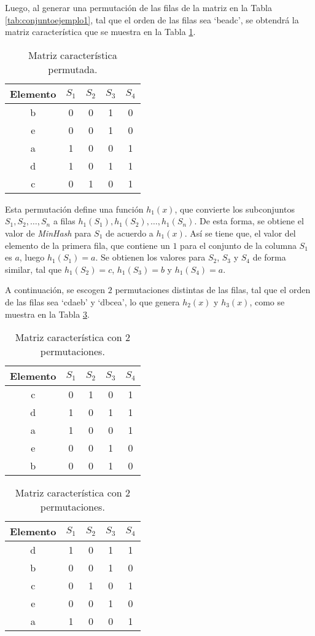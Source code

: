 Luego, al generar una permutación de las filas de la matriz en la Tabla \ref{tab:conjuntoejemplo1},
tal que el orden de las filas sea ‘beadc’, se obtendrá la matriz característica
que se muestra en la Tabla \ref{tab:conjuntoejemplo2}.

\begin{table}[h]
\caption{Matriz característica permutada.}
\label{tab:conjuntoejemplo2}
\small
\centering
\begin{tabular}{ccccc}
\hline
{Elemento} & {$S_1$} & {$S_2$} & {$S_3$} & {$S_4$} \\
\hline
b & 0 & 0 & 1 & 0 \\
e & 0 & 0 & 1 & 0 \\
a & 1 & 0 & 0 & 1 \\
d & 1 & 0 & 1 & 1 \\
c & 0 & 1 & 0 & 1 \\
\hline
\end{tabular}
\end{table}

Esta permutación define una función  $h_1(x)$,
que convierte los subconjuntos $S_1, S_2, \ldots, S_n$ a filas 
$h_1(S_1), h_1(S_2), \ldots, h_1(S_n)$.
De esta forma, se obtiene el valor de \textit{MinHash} para $S_1$ de acuerdo a $h_1(x)$.
Así se tiene que, el valor del elemento de la primera fila,
que contiene un $1$ para el conjunto de la columna $S_1$ es $a$,
luego $h_1(S_1) = a$. Se obtienen los valores para $S_2$, $S_3$ y $S_4$ de forma similar,
tal que $h_1(S_2) = c$, $h_1(S_3) = b$ y $h_1(S_4) = a$.

A continuación, se escogen $2$ permutaciones distintas de las filas,
tal que el orden de las filas sea ‘cdaeb’ y ‘dbcea’, lo que genera $h_2(x)$ y $h_3(x)$,
como se muestra en la Tabla \ref{tab:conjuntoejemplo3}.

\begin{table}[h]
\caption{Matriz característica con 2 permutaciones.}
\label{tab:conjuntoejemplo3}
\small
\centering
\begin{tabular}{ccccc}
\hline
{Elemento} & {$S_1$} & {$S_2$} & {$S_3$} & {$S_4$} \\
\hline
c & 0 & 1 & 0 & 1 \\
d & 1 & 0 & 1 & 1 \\
a & 1 & 0 & 0 & 1 \\
e & 0 & 0 & 1 & 0 \\
b & 0 & 0 & 1 & 0 \\
\hline
\end{tabular}
\quad
\begin{tabular}{ccccc}
\hline
{Elemento} & {$S_1$} & {$S_2$} & {$S_3$} & {$S_4$} \\
\hline
d & 1 & 0 & 1 & 1 \\
b & 0 & 0 & 1 & 0 \\
c & 0 & 1 & 0 & 1 \\
e & 0 & 0 & 1 & 0 \\
a & 1 & 0 & 0 & 1 \\
\hline
\end{tabular}
\end{table}

